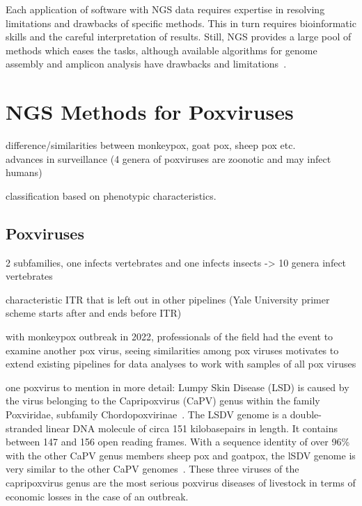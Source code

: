 Each application of software with NGS data requires expertise in resolving limitations and drawbacks of specific methods. This in turn requires bioinformatic skills and the careful interpretation of results. Still, NGS provides a large pool of methods which eases the tasks, although available algorithms for genome assembly and amplicon analysis have drawbacks and limitations~\cite{finotello2012comparative}.



\section{NGS Methods for Poxviruses}

difference/similarities between monkeypox, goat pox, sheep pox etc. \\
advances in surveillance (4 genera of poxviruses are zoonotic and may infect humans)

classification based on phenotypic characteristics.

\subsection{Poxviruses}
2 subfamilies, one infects vertebrates and one infects insects
-> 10 genera infect vertebrates

characteristic ITR that is left out in other pipelines (Yale University primer scheme starts after and ends before ITR)

with monkeypox outbreak in 2022, professionals of the field had the event to examine another pox virus, seeing similarities among pox viruses motivates to extend existing pipelines for data analyses to work with samples of all pox viruses

one poxvirus to mention in more detail:
Lumpy Skin Disease (LSD) is caused by the virus belonging to the Capripoxvirus (CaPV) genus within the family Poxviridae, subfamily Chordopoxvirinae~\cite{walker2019changes}. The LSDV genome is a double-stranded linear DNA molecule of circa 151 kilobasepairs in length. It contains between 147 and 156 open reading frames. With a sequence identity of over 96\% with the other CaPV genus members sheep pox and goatpox, the lSDV genome is very similar to the other CaPV genomes~\cite{tulman2001genome}. These three viruses of the capripoxvirus genus are the most serious poxvirus diseases of livestock in terms of economic losses in the case of an outbreak. 

